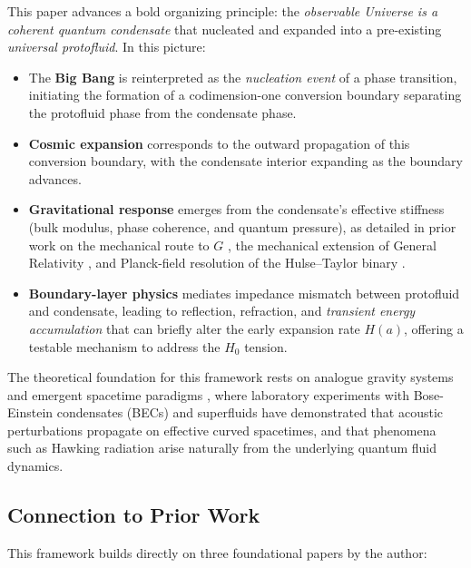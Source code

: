 \documentclass[11pt,a4paper]{article}
\theoremstyle{definition}
\begin{document}
This paper advances a bold organizing principle: the \emph{observable Universe is a coherent quantum condensate} that nucleated and expanded into a pre-existing \emph{universal protofluid}. In this picture:
\begin{itemize}[leftmargin=1.8em]
  \item The \textbf{Big Bang} is reinterpreted as the \emph{nucleation event} of a phase transition, initiating the formation of a codimension-one conversion boundary separating the protofluid phase from the condensate phase.
  \item \textbf{Cosmic expansion} corresponds to the outward propagation of this conversion boundary, with the condensate interior expanding as the boundary advances.
  \item \textbf{Gravitational response} emerges from the condensate's effective stiffness (bulk modulus, phase coherence, and quantum pressure), as detailed in prior work on the mechanical route to $G$ \cite{SkavbergMechG2025}, the mechanical extension of General Relativity \cite{SkavbergMechGR2025}, and Planck-field resolution of the Hulse--Taylor binary \cite{SkavbergPlanckField2025}.
  \item \textbf{Boundary-layer physics} mediates impedance mismatch between protofluid and condensate, leading to reflection, refraction, and \emph{transient energy accumulation} that can briefly alter the early expansion rate $H(a)$, offering a testable mechanism to address the $H_0$ tension.
\end{itemize}

The theoretical foundation for this framework rests on analogue gravity systems \cite{Unruh1981,Visser1998,GarayEtAl2000,Steinhauer2016} and emergent spacetime paradigms \cite{Volovik2003,Jacobson1995,Volovik2008}, where laboratory experiments with Bose-Einstein condensates (BECs) and superfluids have demonstrated that acoustic perturbations propagate on effective curved spacetimes, and that phenomena such as Hawking radiation arise naturally from the underlying quantum fluid dynamics.

\subsection{Connection to Prior Work}
\label{sec:prior_work}

This framework builds directly on three foundational papers by the author:
\end{document}

